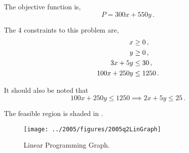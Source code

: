 %
%

\begin{subquestions}
	

\subquestion

The objective function is,
\begin{equation}
	P = 300x + 550y \,.
\end{equation}


\subquestion

The 4 constraints to this problem are, 
\begin{align}
	x & \geq 0 \,, \nonumber \\
	y & \geq 0 \,, \nonumber \\
	3x + 5y & \leq 30 \,, \nonumber \\
	100x + 250y & \leq 1250 \,.
\end{align}

It should also be noted that
\begin{equation}
	100x + 250y \leq 1250 \implies 2x + 5y \leq 25 \,.
\end{equation}


\subquestion

The feasible region is shaded in .
\begin{figure}
	\begin{center}
		\texttt{[image: ../2005/figures/2005q2LinGraph]}
		\caption{\label{2005:q2:fig:LinGraph} Linear Programming Graph.}
	\end{center}
\end{figure}


\end{subquestions}
